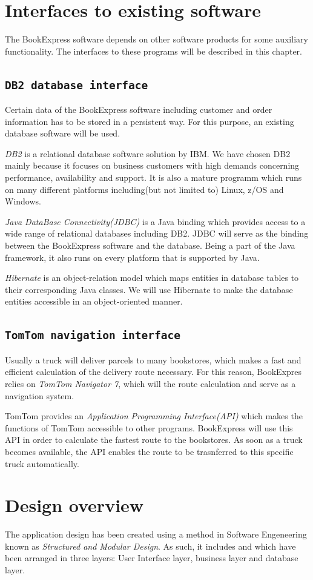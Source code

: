 \chapter{Interfaces to existing software}
The BookExpress software depends on other software products for some auxiliary functionality. The interfaces to these programs will be described in this chapter.
\section{\tt DB2 database interface}
Certain data of the BookExpress software including customer and order information has to be stored in a persistent way. For this purpose, an existing database software will be used.

\emph{DB2} is a relational database software solution by IBM. We have chosen DB2 mainly because it focuses on business customers with high demands concerning performance, availability and support. It is also a mature programm which runs on many different platforms including(but not limited to) Linux, z/OS and Windows.

\emph{Java DataBase Connectivity(JDBC)} is a Java binding which provides access to a wide range of relational databases including DB2. JDBC will serve as the binding between the BookExpress software and the database. Being a part of the Java framework, it also runs on every platform that is supported by Java.

\emph{Hibernate} is an object-relation model which maps entities in database tables to their corresponding Java classes. We will use Hibernate to make the database entities accessible in an object-oriented manner.
\section{\texttt{TomTom navigation interface}}
Usually a truck will deliver parcels to many bookstores, which makes a fast and efficient calculation of the delivery route necessary. For this reason, BookExpres relies on \emph{TomTom Navigator 7}, which will the route calculation and serve as a navigation system.

TomTom provides an \emph{Application Programming Interface(API)} which makes the functions of TomTom accessible to other programs. BookExpress will use this API in order to calculate the fastest route to the bookstores. As soon as a truck becomes available, the API enables the route to be trasnferred to this specific truck automatically.
\chapter{Design overview}
The application design has been created using a method in Software Engeneering known as \emph{Structured and Modular Design}. As such, it includes  and  which have been arranged in three layers: User Interface layer, business layer and database layer.


